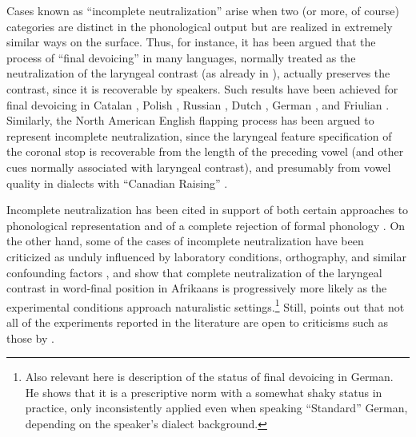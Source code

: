 Cases known as \enquote{incomplete neutralization} arise when two (or more, of course) categories are distinct in the phonological output but are realized in extremely similar ways on the surface. Thus, for instance, it has been argued that the process of \enquote{final devoicing} in many languages, normally treated as the neutralization of the laryngeal contrast (as already in \citealp{Tru39}), actually preserves the contrast, since it is recoverable by speakers. Such results have been achieved for final devoicing in Catalan \citep{dinnsen84:_phonol,charles-luce87:_catal}, Polish \citep{slowiaczek85:_polis,slowiaczek89:_percep_polis}, Russian \citep{pye86:_word_russian,dmitrieva10:_phonol}, Dutch \citep{ernestus06:_funct_of_incom_neutr_in_dutch,ernestus07:_intrap_effec_percep_of_voice}, German \citep[\egm][]{port85:_neutr_german}, and Friulian \citep{baroni00:_friul}. Similarly, the North American English flapping process has been argued to represent incomplete neutralization, since the laryngeal feature specification of the coronal stop is recoverable from the length of the preceding vowel (and other cues normally associated with laryngeal contrast), and presumably from vowel quality in dialects with \enquote{Canadian Raising} \citep{fisher76:_inter_englis,fox77:_dental_americ_englis,zue79:_acous_americ_englis,braver11:_incom_americ_englis}.

Incomplete neutralization has been cited in support of both certain approaches to phonological representation \citep[\egm][]{oostendorp08:_incom} and of a complete rejection of formal phonology \citep{port05:_again_formal_phonol}. On the other hand, some of the cases of incomplete neutralization have been criticized as unduly influenced by laboratory conditions, orthography, and similar confounding factors \citep{fourakis84:_german,manaster96,Warner2004251}, and \citet{rooy03:_demys} show that complete neutralization of the laryngeal contrast in word\hyp final position in Afrikaans is progressively more likely as the experimental conditions approach naturalistic settings.\footnote{Also relevant here is  description of the status of final devoicing in German. He shows that it is a prescriptive norm with a somewhat shaky status in practice, only inconsistently applied even when speaking \enquote{Standard} German, depending on the speaker's dialect background.} Still, \citet{jansen04:_laryn} points out that not all of the experiments reported in the literature are open to criticisms such as those by \citet{fourakis84:_german}.

